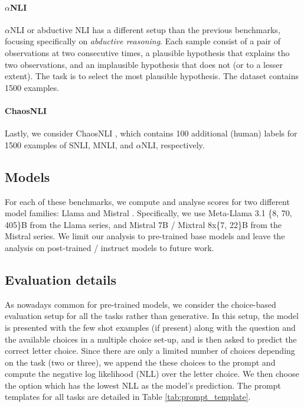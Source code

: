 \vspace{-1mm}
\paragraph{$\alpha$NLI}
$\alpha$NLI or abductive NLI \citep{bhagavatula2020abductive} has a different setup than the previous benchmarks, focusing specifically on \emph{abductive reasoning}.
Each sample consist of a pair of observations at two consecutive times, a plausible hypothesis that explains tho two observations, and an implausible hypothesis that does not (or to a lesser extent).
The task is to select the most plausible hypothesis.
The dataset contains 1500 examples.

\vspace{-1mm}
\paragraph{ChaosNLI}
Lastly, we consider ChaosNLI \citep{nie-etal-2020-learn}, which contains 100 additional (human) labels for 1500 examples of SNLI, MNLI, and $\alpha$NLI, respectively.

\subsection{Models} For each of these benchmarks, we compute and analyse scores for two different model families: Llama \citep{dubey2024llama} and Mistral \citep{jiang2023mistral, jiang2024mixtral}. 
Specifically, we use Meta-Llama 3.1 \{8, 70, 405\}B from the Llama series, and Mistral 7B / Mixtral 8x\{7, 22\}B from the Mistral series.
We limit our analysis to pre-trained base models and leave the analysis on post-trained / instruct models to future work.

\subsection{Evaluation details}
As nowadays common for pre-trained models, we consider the choice-based evaluation setup for all the tasks rather than generative. 
In this setup, the model is presented with the few shot examples (if present) along with the question and the available choices in a multiple choice set-up, and is then asked to predict the correct letter choice.
Since there are only a limited number of choices depending on the task (two or three), we append the these choices to the prompt and compute the negative log likelihood (NLL) over the letter choice. 
We then choose the option which has the lowest NLL as the model's prediction. 
The prompt templates for all tasks are detailed in Table \ref{tab:prompt_template}.

